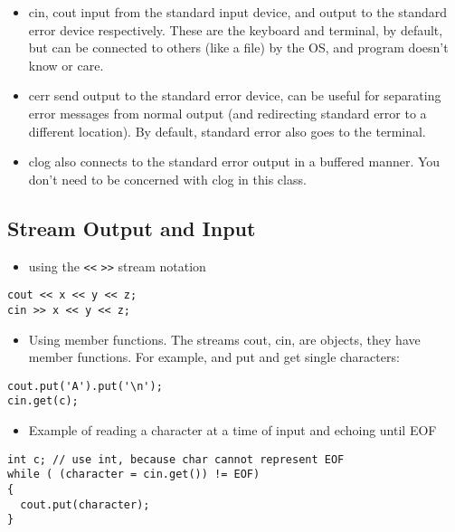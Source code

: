 \documentclass[11pt]{article}
\begin{document}
\begin{itemize}
\item cin, cout input from the standard input device, and output to the
standard error device respectively.  These are the keyboard and
terminal, by default, but can be connected to others (like a file)
by the OS, and program doesn't know or care.
\item cerr send output to the standard error device, can be useful for
separating error messages from normal output (and redirecting
standard error to a different location).  By default, standard error
also goes to the terminal.
\item clog also connects to the standard error output in a buffered
manner.  You don't need to be concerned with clog in this class.
\end{itemize}
\subsection{Stream Output and Input}
\label{sec-1-4}

\begin{itemize}
\item using the \verb~<<~ \verb~>>~  stream notation
\end{itemize}
\begin{verbatim}
cout << x << y << z;
cin >> x << y << z;
\end{verbatim}

\begin{itemize}
\item Using member functions.  The streams cout, cin, are objects, they have
member functions.  For example, and put and get single characters:
\end{itemize}

\begin{verbatim}
cout.put('A').put('\n');
cin.get(c);
\end{verbatim}

\begin{itemize}
\item Example of reading a character at a time of input and echoing until EOF
\end{itemize}

\begin{verbatim}
int c; // use int, because char cannot represent EOF
while ( (character = cin.get()) != EOF)
{
  cout.put(character);
}
\end{verbatim}
\end{document}
